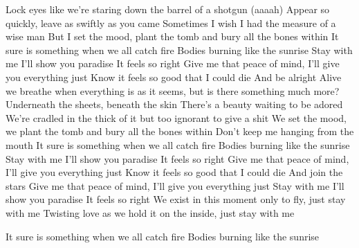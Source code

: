 
\beginverse
Lock eyes like we're staring down the barrel of a 
shotgun (aaaah)
Appear so quickly, leave as 
swiftly as you came
Sometimes I wish I had the measure of a wise man
But I set the mood, plant the tomb and 
bury all the bones within
\endverse
\beginverse*
It sure is something when we all catch fire
Bodies burning like the sunrise
\endverse
\beginchorus
Stay with me I'll show you paradise
It feels so right
Give me that peace of mind, I'll give you 
everything just
Know it feels so good that I could die
And be alright
\endchorus
\beginverse
Alive we breathe when 
everything is as it seems, but is there 
something much more?
Underneath the sheets, beneath the skin
There's a beauty waiting to be adored
\endverse
\beginverse*
We're cradled in the thick of it 
but too ignorant to give a shit
We set the mood, we plant the tomb
and bury all the bones within
Don't keep me hanging from the mouth
\endverse
\beginverse*
It sure is something when we all catch fire
Bodies burning like the sunrise
\endverse
\beginchorus
Stay with me I'll show you paradise
It feels so right
Give me that peace of mind, I'll give you 
everything just
Know it feels so good that I could die
And join the stars
Give me that peace of mind, I'll give you 
everything just
Stay with me
I'll show you paradise
It feels so right
\endchorus
\beginverse*
We exist in this moment only to 
fly, just stay with me
Twisting love as we hold it on the 
inside, just stay with me

It sure is something when we all catch fire
Bodies burning like the sunrise
\endverse*
{}
\endsong


